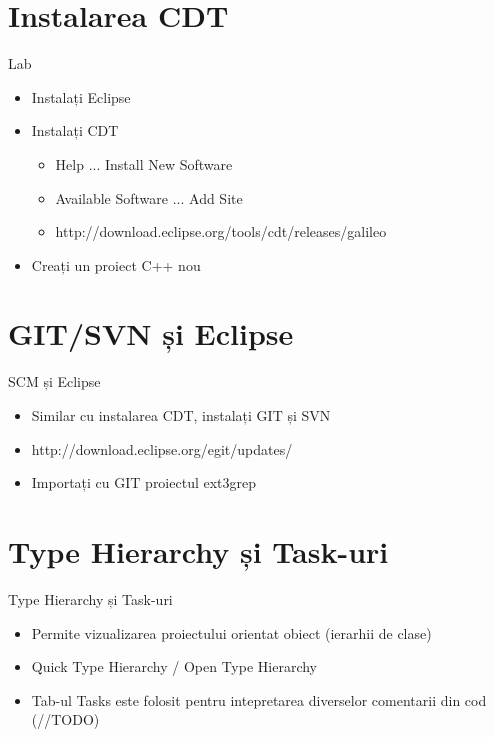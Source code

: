 \documentclass{beamer}
\begin{document}
\section{Instalarea CDT}

\begin{frame}{Lab}
  \begin{itemize}
  \item Instalați Eclipse
  \item Instalați CDT
		\begin{itemize} 
		\pause
	  \item Help ... Install New Software
  	\pause
	  \item Available Software ... Add Site
  	\item http://download.eclipse.org/tools/cdt/releases/galileo
  	\end{itemize}
  \item Creați un proiect C++ nou
  \end{itemize}
\end{frame}

\section{GIT/SVN și Eclipse}

\begin{frame}{SCM și Eclipse}
  \begin{itemize}
  \item Similar cu instalarea CDT, instalați GIT și SVN
	\pause
	\item http://download.eclipse.org/egit/updates/
	\pause
  \item Importați cu GIT proiectul ext3grep
  \end{itemize}
\end{frame}

\section{Type Hierarchy și Task-uri}

\begin{frame}{Type Hierarchy și Task-uri }
  \begin{itemize}
  \item Permite vizualizarea proiectului orientat obiect (ierarhii de clase)
	\pause
  \item Quick Type Hierarchy / Open Type Hierarchy
  \pause
  \item Tab-ul Tasks este folosit pentru intepretarea diverselor comentarii din cod (//TODO)
  \end{itemize}
\end{frame}
\end{document}
